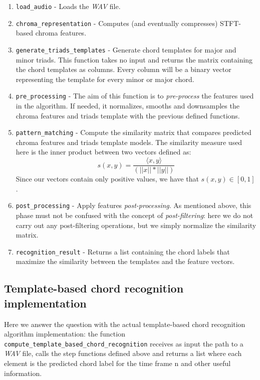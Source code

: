 \documentclass[
	12pt, %
]{fphw}
\begin{document}
\begin{enumerate}
	\item \verb|load_audio| - Loads the \emph{WAV} file.
	\item \verb|chroma_representation| - Computes (and eventually compresses) STFT-based chroma features.
	\item \verb|generate_triads_templates| - Generate chord templates for major and minor triads. This function takes no input and returns the matrix containing the chord templates as columns. Every column will be a binary vector representing the template for every minor or major chord.
	\item \verb|pre_processing| - The aim of this function is to \emph{pre-process} the features used in the algorithm. If needed, it normalizes, smooths and downsamples the chroma features and triads template with the previous defined functions.
	\item \verb|pattern_matching| - Compute the similarity matrix that compares predicted chroma features and triads template models. The similarity measure used here is the inner product between two vectors defined as:
	\begin{equation}
		s(x,y)=\frac{\langle x,y\rangle}{(||x||*||y||)}
	\end{equation}
Since our vectors contain only positive values, we have that $s(x,y)\in[0,1]$.
	\item \verb|post_processing| - Apply features \emph{post-processing}. As mentioned above, this phase must not be confused with the concept of \emph{post-filtering}: here we do not carry out any post-filtering operations, but we simply normalize the similarity matrix.
	\item \verb|recognition_result| - Returns a list containing the chord labels that maximize the similarity between the templates and the feature vectors.
\end{enumerate}

\subsection*{Template-based chord recognition implementation}

Here we answer the question with the actual template-based chord recognition algorithm implementation: the function \verb|compute_template_based_chord_recognition| receives as input the path to a \emph{WAV} file, calls the step functions defined above and returns a list where each element is the predicted chord label for the time frame n and other useful information.
\end{document}
